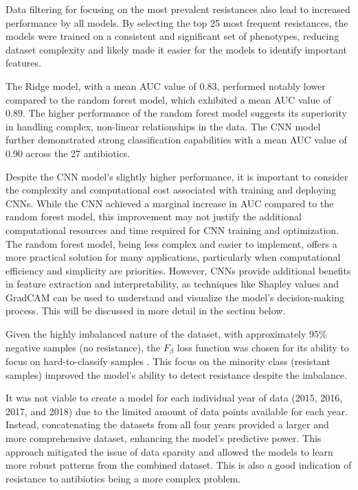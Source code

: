 \documentclass[english,11pt,a4paper,titlepage]{article}
\begin{document}
Data filtering for focusing on the most prevalent resistances also lead to increased performance by all models. By selecting the top 25 most frequent resistances, the models were trained on a consistent and significant set of phenotypes, reducing dataset complexity and likely made it easier for the models to identify important features.

The Ridge model, with a mean AUC value of 0.83, performed notably lower compared to the random forest model, which exhibited a mean AUC value of 0.89. The higher performance of the random forest model suggests its superiority in handling complex, non-linear relationships in the data. The CNN model further demonstrated strong classification capabilities with a mean AUC value of 0.90 across the 27 antibiotics.

Despite the CNN model's slightly higher performance, it is important to consider the complexity and computational cost associated with training and deploying CNNs. While the CNN achieved a marginal increase in AUC compared to the random forest model, this improvement may not justify the additional computational resources and time required for CNN training and optimization. The random forest model, being less complex and easier to implement, offers a more practical solution for many applications, particularly when computational efficiency and simplicity are priorities. However, CNNs provide additional benefits in feature extraction and interpretability, as techniques like Shapley values and GradCAM can be used to understand and visualize the model's decision-making process. This will be discussed in more detail in the section below.

Given the highly imbalanced nature of the dataset, with approximately 95\% negative samples (no resistance), the \( F_\beta \) loss function was chosen for its ability to focus on hard-to-classify samples \cite{leeSurrogateLossFunction2021}. This focus on the minority class (resistant samples) improved the model's ability to detect resistance despite the imbalance. 

It was not viable to create a model for each individual year of data (2015, 2016, 2017, and 2018) due to the limited amount of data points available for each year. Instead, concatenating the datasets from all four years provided a larger and more comprehensive dataset, enhancing the model's predictive power. This approach mitigated the issue of data sparsity and allowed the models to learn more robust patterns from the combined dataset. This is also a good indication of resistance to antibiotics being a more complex problem.
\end{document}
